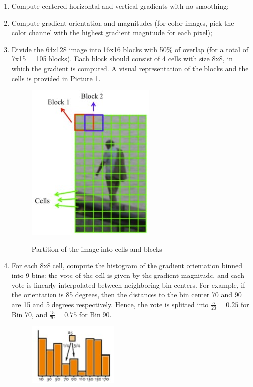 \begin{enumerate}
    \item Compute centered horizontal and vertical gradients with no smoothing;
    \item Compute gradient orientation and magnitudes (for color images, pick the color channel with the highest gradient magnitude for each pixel);
    \item Divide the 64x128 image into 16x16 blocks with 50\% of overlap (for a total of 7x15 = 105 blocks). Each block should consist of 4 cells with size 8x8, in which the gradient is computed. A visual representation of the blocks and the cells is provided in Picture \ref{cells_blocks}.

    \begin{figure}[h!]
		\centering
		\includegraphics[scale = 2.0]{img/cells_blocks.jpg}
          \label{cells_blocks}
          \caption{Partition of the image into cells and blocks}
    \end{figure}

    \item For each 8x8 cell, compute the histogram of the gradient orientation binned into 9 bins: the vote of the cell is given by the gradient magnitude, and each vote is linearly interpolated between neighboring bin centers. For example, if the orientation is 85 degrees, then the distances to the bin center 70 and 90 are 15 and 5 degrees respectively. Hence, the vote is splitted into $\frac{5}{20} = 0.25$ for Bin 70, and $\frac{15}{20} = 0.75$ for Bin 90.

    \begin{figure}[h!]
		\centering
		\includegraphics[scale = 2.0]{img/vote}
    \end{figure}


\end{enumerate}
